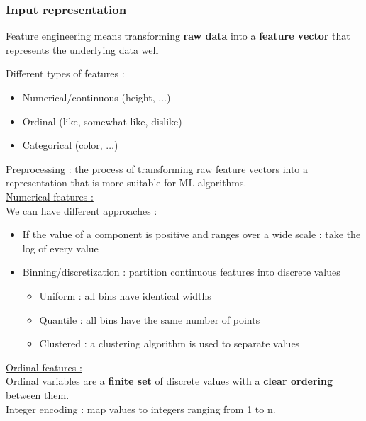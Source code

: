 \documentclass[../main.tex]{subfiles}
\begin{document}
\subsubsection{Input representation}
\begin{center}
    Feature engineering means transforming \textbf{raw data} into a \textbf{feature vector} that represents the underlying data well
\end{center}

Different types of features : \begin{itemize}
    \item Numerical/continuous (height, $\dots$)\\
    \item Ordinal (like, somewhat like, dislike)\\
    \item Categorical (color, $\dots$)\\
\end{itemize}

\quad \underline{Preprocessing :} the process of transforming raw feature vectors into a representation that is more suitable for ML algorithms.\\

\quad \underline{Numerical features :}\\
We can have different approaches : \begin{itemize}
    \item If the value of a component is positive and ranges over a wide scale : take the log of every value\\
    \item Binning/discretization : partition continuous features into discrete values \begin{itemize}
        \item Uniform : all bins have identical widths\\
        \item Quantile : all bins have the same number of points\\
        \item Clustered : a clustering algorithm is used to separate values\\
    \end{itemize}
\end{itemize}

\quad \underline{Ordinal features :}\\
Ordinal variables are a \textbf{finite set} of discrete values with a \textbf{clear ordering} between them.\\
Integer encoding : map values to integers ranging from 1 to n.\\
\end{document}
